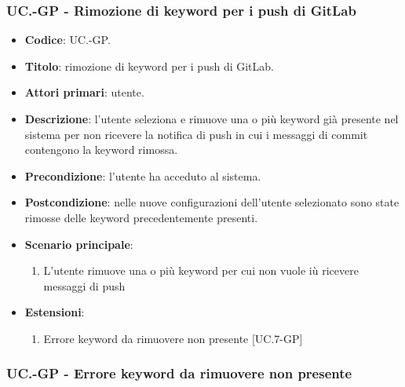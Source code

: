 	\subsubsection{UC\theuccount.\thesubuccount-GP - Rimozione di keyword per i push di GitLab}

	\begin{itemize}
		\item \textbf{Codice}: UC\theuccount.\thesubuccount-GP.
		\item \textbf{Titolo}: rimozione di keyword per i push di GitLab.
		\item \textbf{Attori primari}: utente.
		\item \textbf{Descrizione}: l’utente seleziona e rimuove una o più keyword già presente nel sistema per non ricevere la notifica di push in
		cui i messaggi di commit contengono la keyword rimossa.
		\item \textbf{Precondizione}:  l’utente ha acceduto al sistema.
		\item \textbf{Postcondizione}: nelle nuove configurazioni dell'utente selezionato sono state rimosse delle keyword precedentemente presenti.
		\item \textbf{Scenario principale}:
		\begin{enumerate}
			\item L'utente rimuove una o più keyword per cui non vuole iù ricevere messaggi di push
		\end{enumerate}
		\item \textbf{Estensioni}:
		\begin{enumerate}
			\item Errore keyword da rimuovere non presente [UC\theuccount.7-GP]
		\end{enumerate}
	\end{itemize}
	
	\subsubsection{UC\theuccount.\thesubuccount-GP - Errore keyword da rimuovere non presente}
	

